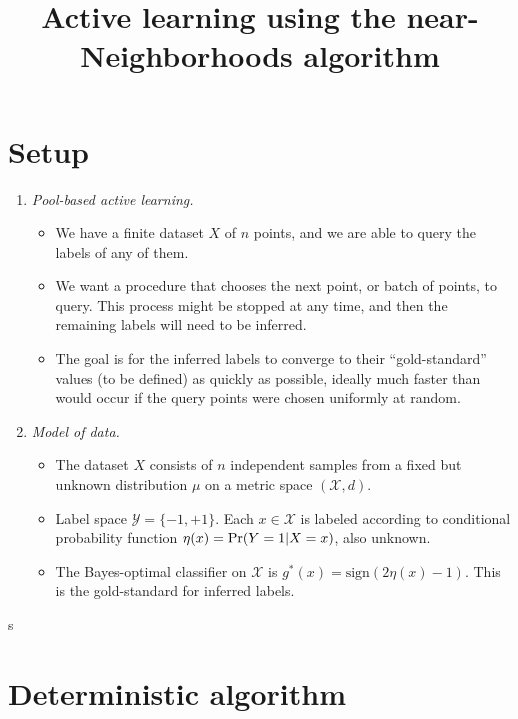 \documentclass{article}
\title{Active learning using the near-Neighborhoods algorithm}
\def\pr{{\rm Pr}}
\def\X{{\mathcal X}}
\def\Y{{\mathcal Y}}
\begin{document}
\maketitle
\section{Setup}

\begin{enumerate}
\item {\it Pool-based active learning.}

\begin{itemize}
\item We have a finite dataset $X$ of $n$ points, and we are able to query the labels of any of them.
\item We want a procedure that chooses the next point, or batch of points, to query. This process might be stopped at any time, and then the remaining labels will need to be inferred.
\item The goal is for the inferred labels to converge to their ``gold-standard'' values (to be defined) as quickly as possible, ideally much faster than would occur if the query points were chosen uniformly at random.
\end{itemize}

\item {\it Model of data.}

\begin{itemize}
\item The dataset $X$ consists of $n$ independent samples from a fixed but unknown distribution $\mu$ on a metric space $(\X, d)$. 
\item Label space $\Y = \{-1,+1\}$. Each $x \in \X$ is labeled according to conditional probability function $\eta(x) = \pr(Y=1|X=x)$, also unknown.
\item The Bayes-optimal classifier on $\X$ is $g^*(x) = \mbox{sign}(2 \eta(x) - 1)$. This is the gold-standard for inferred labels.
\end{itemize}


\end{enumerate}

s\section{Deterministic algorithm}
\end{document}
